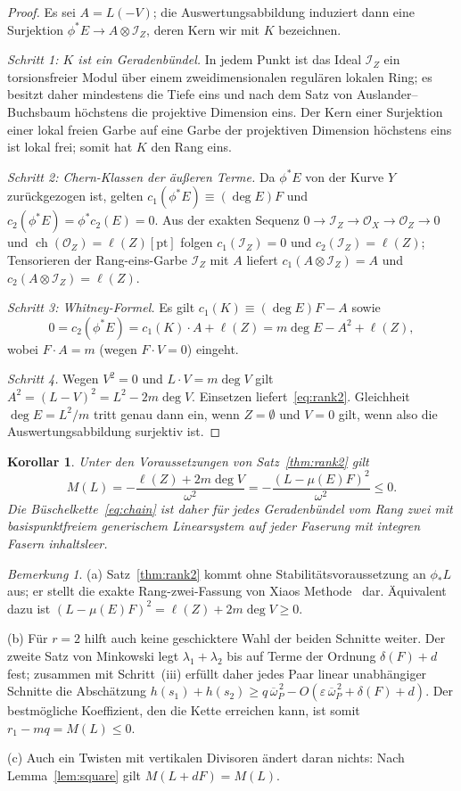 \documentclass[11pt]{article}
\newtheorem{corollary}[theorem]{Korollar}
\theoremstyle{definition}
\theoremstyle{remark}
\newtheorem{remark}[theorem]{Bemerkung}
\DeclareMathOperator{\ch}{ch}
\newcommand{\OO}{\mathcal{O}}
\newcommand{\cI}{\mathcal{I}}
\newcommand{\ob}{\overline{\omega}}
\begin{document}
\begin{proof}
Es sei $A=L(-V)$; die Auswertungsabbildung induziert dann eine Surjektion $\phi^*E\to
A\otimes\cI_Z$, deren Kern wir mit $K$ bezeichnen.

\emph{Schritt 1: $K$ ist ein Geradenbündel.} In jedem Punkt ist das Ideal
$\cI_Z$ ein torsionsfreier Modul über einem zweidimensionalen regulären lokalen
Ring; es besitzt daher mindestens die Tiefe eins und nach dem Satz von
Auslander--Buchsbaum höchstens die projektive Dimension eins. Der Kern einer
Surjektion einer lokal freien Garbe auf eine Garbe der projektiven Dimension
höchstens eins ist lokal frei; somit hat $K$ den Rang eins.

\emph{Schritt 2: Chern-Klassen der äußeren Terme.} Da $\phi^*E$ von der Kurve
$Y$ zurückgezogen ist, gelten $c_1(\phi^*E)\equiv(\deg E)F$ und
$c_2(\phi^*E)=\phi^*c_2(E)=0$. Aus der exakten Sequenz
$0\to\cI_Z\to\OO_X\to\OO_Z\to 0$ und $\ch(\OO_Z)=\ell(Z)[\mathrm{pt}]$ folgen
$c_1(\cI_Z)=0$ und $c_2(\cI_Z)=\ell(Z)$; Tensorieren der Rang-eins-Garbe $\cI_Z$
mit $A$ liefert $c_1(A\otimes\cI_Z)=A$ und $c_2(A\otimes\cI_Z)=\ell(Z)$.

\emph{Schritt 3: Whitney-Formel.} Es gilt $c_1(K)\equiv(\deg E)F-A$ sowie
\[
0=c_2(\phi^*E)=c_1(K)\cdot A+\ell(Z)=m\deg E-A^2+\ell(Z),
\]
wobei $F\cdot A=m$ (wegen $F\cdot V=0$) eingeht.

\emph{Schritt 4.} Wegen $V^2=0$ und $L\cdot V=m\deg V$ gilt
$A^2=(L-V)^2=L^2-2m\deg V$. Einsetzen liefert~\eqref{eq:rank2}. Gleichheit
$\deg E=L^2/m$ tritt genau dann ein, wenn $Z=\emptyset$ und $V=0$ gilt, wenn also
die Auswertungsabbildung surjektiv ist.
\end{proof}

\begin{corollary}\label{cor:rank2}
Unter den Voraussetzungen von Satz~\ref{thm:rank2} gilt
\[
M(L)=-\frac{\ell(Z)+2m\deg V}{\omega^2}=-\frac{(L-\mu(E)F)^2}{\omega^2}\le 0 .
\]
Die Büschelkette~\eqref{eq:chain} ist daher für jedes Geradenbündel vom Rang zwei
mit basispunktfreiem generischem Linearsystem auf jeder Faserung mit integren
Fasern inhaltsleer.
\end{corollary}

\begin{remark}\label{rem:rank2}
(a) Satz~\ref{thm:rank2} kommt ohne Stabilitätsvoraussetzung an $\phi_*L$ aus; er
stellt die exakte Rang-zwei-Fassung von Xiaos Methode~\cite{Xi87} dar. Äquivalent
dazu ist $(L-\mu(E)F)^2=\ell(Z)+2m\deg V\ge 0$.

(b) Für $r=2$ hilft auch keine geschicktere Wahl der beiden Schnitte weiter. Der
zweite Satz von Minkowski legt $\lambda_1+\lambda_2$ bis auf Terme der Ordnung
$\delta(F)+d$ fest; zusammen mit Schritt~(iii) erfüllt daher jedes Paar linear
unabhängiger Schnitte die Abschätzung
$h(s_1)+h(s_2)\ge q\,\ob_P^{\,2}-O(\varepsilon\,\ob_P^{\,2}+\delta(F)+d)$. Der
bestmögliche Koeffizient, den die Kette erreichen kann, ist somit
$r_1-mq=M(L)\le 0$.

(c) Auch ein Twisten mit vertikalen Divisoren ändert daran nichts: Nach
Lemma~\ref{lem:square} gilt $M(L+dF)=M(L)$.
\end{remark}
\end{document}
